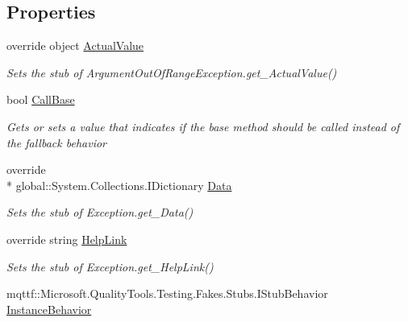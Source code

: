 \subsection*{Properties}
\begin{DoxyCompactItemize}
\item 
override object \hyperlink{class_system_1_1_fakes_1_1_stub_argument_out_of_range_exception_a03c824aefcfd70133ed19ec70f15445d}{Actual\-Value}
\begin{DoxyCompactList}\small\item\em Sets the stub of Argument\-Out\-Of\-Range\-Exception.\-get\-\_\-\-Actual\-Value()\end{DoxyCompactList}\item 
bool \hyperlink{class_system_1_1_fakes_1_1_stub_argument_out_of_range_exception_a1c60bb0778e78ad9fe813b497a11c24f}{Call\-Base}
\begin{DoxyCompactList}\small\item\em Gets or sets a value that indicates if the base method should be called instead of the fallback behavior\end{DoxyCompactList}\item 
override \\*
global\-::\-System.\-Collections.\-I\-Dictionary \hyperlink{class_system_1_1_fakes_1_1_stub_argument_out_of_range_exception_ae234c1659a84d86f484f638460c58a7e}{Data}
\begin{DoxyCompactList}\small\item\em Sets the stub of Exception.\-get\-\_\-\-Data()\end{DoxyCompactList}\item 
override string \hyperlink{class_system_1_1_fakes_1_1_stub_argument_out_of_range_exception_ac375923652844bc844f031e8cb569de3}{Help\-Link}
\begin{DoxyCompactList}\small\item\em Sets the stub of Exception.\-get\-\_\-\-Help\-Link()\end{DoxyCompactList}\item 
mqttf\-::\-Microsoft.\-Quality\-Tools.\-Testing.\-Fakes.\-Stubs.\-I\-Stub\-Behavior \hyperlink{class_system_1_1_fakes_1_1_stub_argument_out_of_range_exception_ab3e5d615d76631f9b08814610016f99e}{Instance\-Behavior}

\end{DoxyCompactItemize}
